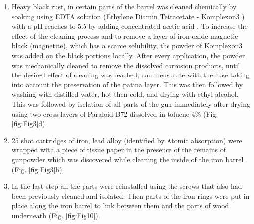 \begin{enumerate}
	\item Heavy black rust, in certain parts of the barrel was cleaned chemically by soaking using EDTA solution (Ethylene Diamin Tetracetate - Komplexon3 %
	) with a pH reaches to 5.5 by adding concentrated acetic acid \parencite[225]{Sobhy_2006}. To increase the effect of the cleaning process and to remove a layer of iron oxide magnetic black (magnetite), which has a scarce solubility, the powder of Komplexon3 was added on the black portions locally. After every application, the powder was mechanically cleaned to remove the dissolved corrosion products, until the desired effect of cleaning was reached, commensurate with the case taking into account the preservation of the patina layer. This was then followed by washing with distilled water, hot then cold, and drying with ethyl alcohol. This was followed by isolation of all parts of the gun immediately after drying using two cross layers of Paraloid B72 dissolved in toluene 4\% (Fig. \ref{fig:Fig3}d).
	\item 25 shot cartridges of iron, lead alloy (identified by Atomic absorption) were wrapped with a piece of tissue paper in the presence of the remains of gunpowder which was discovered while cleaning the inside of the iron barrel (Fig. \ref{fig:Fig3}b).
	\item In the last step all the parts were reinstalled using the screws that also had been previously cleaned and isolated. Then parts of the iron rings were put in place along the iron barrel to link between them and the parts of wood underneath (Fig. \ref{fig:Fig10}).
\end{enumerate}

